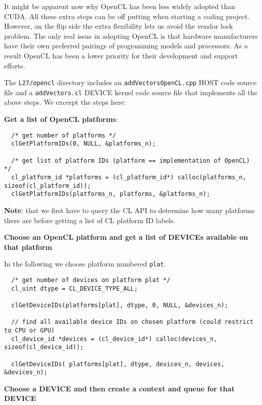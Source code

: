 It might be apparent now why OpenCL has been less widely adopted than CUDA. All these extra steps can be off putting when starting a coding project. However, on the flip side the extra flexibility lets us avoid the vendor lock problem. The only real issue in adopting OpenCL is that hardware manufacturers have their own preferred pairings of programming models and processors. As a result OpenCL has been a lower priority for their development and support efforts. 

The \texttt{L27/opencl} directory includes an \texttt{addVectorsOpenCL.cpp} HOST code source file and a \texttt{addVectors.cl} DEVICE kernel code source file that implements all the above steps. We excerpt the steps here:

{\bf Get a list of OpenCL platforms}: 

\begin{verbatim}
  /* get number of platforms */
  clGetPlatformIDs(0, NULL, &platforms_n);

  /* get list of platform IDs (platform == implementation of OpenCL) */
  cl_platform_id *platforms = (cl_platform_id*) calloc(platforms_n, sizeof(cl_platform_id));
  clGetPlatformIDs(platforms_n, platforms, &platforms_n);
\end{verbatim}

{\bf Note}: that we first have to query the CL API to determine how many platforms there are before getting a list of CL platform ID labels.

{\bf Choose an OpenCL platform and get a list of DEVICEs available on that platform}

In the following we choose platform numbered \texttt{plat}. 

\begin{verbatim}
  /* get number of devices on platform plat */
  cl_uint dtype = CL_DEVICE_TYPE_ALL;

  clGetDeviceIDs(platforms[plat], dtype, 0, NULL, &devices_n);

  // find all available device IDs on chosen platform (could restrict to CPU or GPU)                                                                     
  cl_device_id *devices = (cl_device_id*) calloc(devices_n, sizeof(cl_device_id));

  clGetDeviceIDs( platforms[plat], dtype, devices_n, devices, &devices_n);
\end{verbatim}

{\bf Choose a DEVICE and then create a context and queue for that DEVICE}

